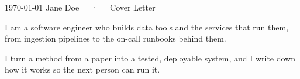 \documentclass[11pt, a4paper]{awesome-cv}
\begin{document}
\makecvheader[R]

\makecvfooter
  {\today}
  {Jane Doe~~~·~~~Cover Letter}
  {}

\makelettertitle

\begin{cvletter}

I am a software engineer who builds data tools and the services that run them, from ingestion pipelines to the on-call runbooks behind them.

I turn a method from a paper into a tested, deployable system, and I write down how it works so the next person can run it.

\end{cvletter}

\makeletterclosing
\end{document}
